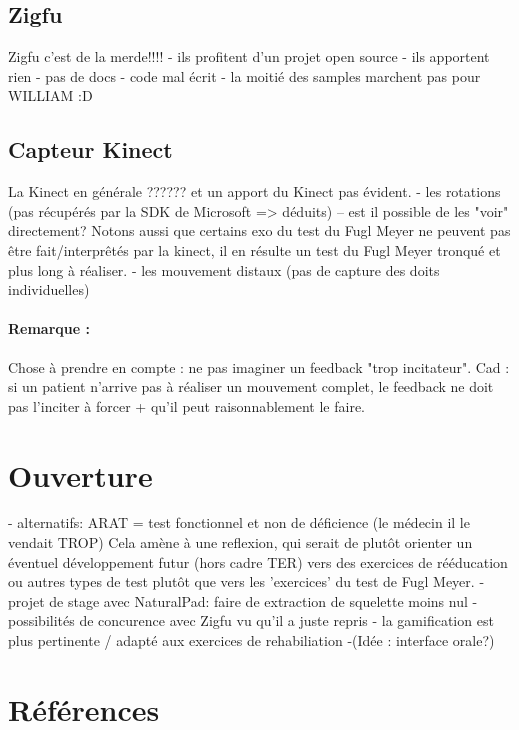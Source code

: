\documentclass[french,12pt]{report}
\begin{document}
			\subsection{Zigfu}	
		Zigfu c'est de la merde!!!!
		- ils profitent d'un projet open source
		- ils apportent rien
		- pas de docs
		- code mal écrit
		- la moitié des samples marchent pas pour WILLIAM :D
		
		\subsection{Capteur Kinect}
		La Kinect en générale ??????  et un apport du Kinect pas évident.
		- les rotations (pas récupérés par la SDK de Microsoft => déduits)
		  -- est il possible de les "voir" directement?  
Notons aussi que certains exo du test du Fugl Meyer ne peuvent pas être fait/interprêtés par la kinect, il en résulte
un test du Fugl Meyer tronqué et plus long à réaliser.
		- les mouvement distaux (pas de capture des doits individuelles)

\paragraph{Remarque :\\}
Chose à prendre en compte : ne pas imaginer un feedback "trop incitateur". Cad : si un patient n'arrive pas à 
réaliser un mouvement complet, le feedback ne doit pas l'inciter à forcer + qu’il peut raisonnablement le faire.
		
		\section{Ouverture}	%
		
		- alternatifs: ARAT = test fonctionnel et non de déficience (le médecin il le vendait TROP)
Cela amène à une reflexion, qui serait de plutôt orienter un éventuel développement futur (hors cadre TER) vers
des exercices de rééducation ou autres types de test plutôt que vers les 'exercices' du test de Fugl Meyer.
		- projet de stage avec NaturalPad: faire de extraction de squelette moins nul
		- possibilités de concurence avec Zigfu vu qu'il a juste repris 
		- la gamification est plus pertinente / adapté aux exercices de rehabiliation 
		-(Idée : interface orale?)
		
		\section{Références}
\end{document}
